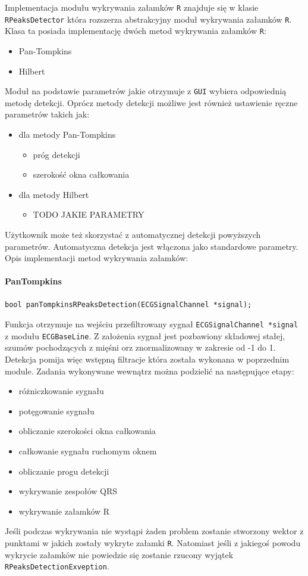 \documentclass[a4paper, 11pt]{article}
\begin{document}
Implementacja modułu wykrywania załamków \verb|R| znajduje się w klasie \verb|RPeaksDetector| która rozszerza abstrakcyjny moduł wykrywania załamków \verb|R|. Klasa ta posiada implementację dwóch metod wykrywania załamków \verb|R|:
\begin{itemize}
	\item Pan-Tompkins
	\item Hilbert
\end{itemize}
Moduł na podstawie parametrów jakie otrzymuje z \verb|GUI| wybiera odpowiednią metodę detekcji. Oprócz metody detekcji możliwe jest również ustawienie ręczne parametrów takich jak:
\begin{itemize}
	\item dla metody Pan-Tompkins
	\begin{itemize}
		\item próg detekcji
		\item szerokość okna całkowania
	\end{itemize}
	\item dla metody Hilbert
	\begin{itemize}
		\item TODO JAKIE PARAMETRY
	\end{itemize}
\end{itemize}
Użytkownik może też skorzystać z automatycznej detekcji powyższych parametrów. Automatyczna detekcja jest włączona jako standardowe parametry.
Opis implementacji metod wykrywania załamków:
\paragraph{PanTompkins}
\begin{lstlisting}
bool panTompkinsRPeaksDetection(ECGSignalChannel *signal);
\end{lstlisting}
Funkcja otrzymuje na wejściu przefiltrowany sygnał \verb|ECGSignalChannel *signal| z modułu \verb|ECGBaseLine|. Z założenia sygnał jest pozbawiony składowej stałej, szumów pochodzących z mięśni orz znormalizowany w zakresie od -1 do 1. Detekcja pomija więc wstępną filtracje która została wykonana w poprzednim module. Zadania wykonywane wewnątrz można podzielić na następujące etapy:
\begin{itemize}
	\item różniczkowanie sygnału
	\item potęgowanie sygnału
	\item obliczanie szerokości okna całkowania 
	\item całkowanie sygnału ruchomym oknem
	\item obliczanie progu detekcji 
	\item wykrywanie zespołów QRS
	\item wykrywanie załamków R
\end{itemize}
Jeśli podczas wykrywania nie wystąpi żaden problem zostanie stworzony wektor z punktami w jakich zostały wykryte załamki \verb|R|. Natomiast jeśli z jakiegoś powodu wykrycie załamków nie powiedzie się zostanie rzucony wyjątek \verb|RPeaksDetectionExveption|.
\end{document}
